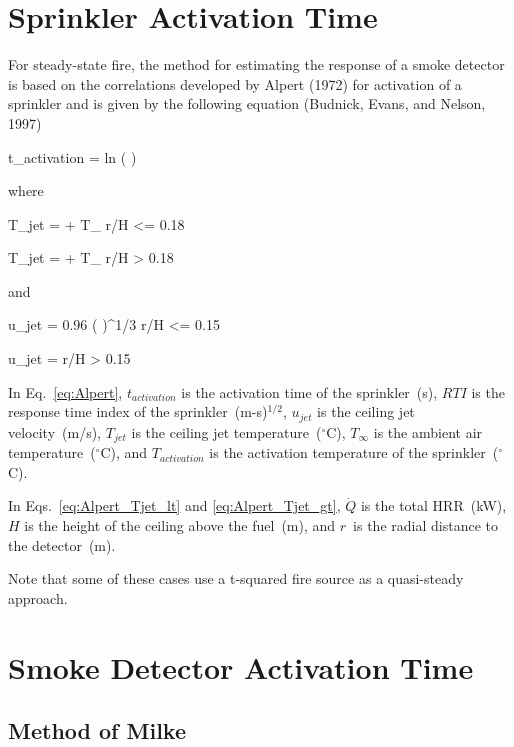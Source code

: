 \clearpage


\section{Sprinkler Activation Time}

For steady-state fire, the method for estimating the response of a smoke detector is based on the correlations developed by Alpert (1972) for activation of a sprinkler and is given by the following equation (Budnick, Evans, and Nelson, 1997)

\be
t_{activation} =   ln \left(  \right)\label{eq:Alpert}
\ee

\noindent where

\be
T_{jet} =  + T_\infty {} r/H <= 0.18
\label{eq:Alpert_Tjet_lt}
\ee

\be
T_{jet} =  + T_\infty {} r/H > 0.18
\label{eq:Alpert_Tjet_gt}
\ee

\noindent and

\be
u_{jet} = 0.96 \left(  \right)^{1/3}  r/H <= 0.15
\label{eq:Alpert_ujet_lt}
\ee

\be
u_{jet} =   r/H > 0.15
\label{eq:Alpert_ujet_gt}
\ee

In Eq.~\ref{eq:Alpert}, $t_{activation}$ is the activation time of the sprinkler~(s), $RTI$ is the response time index of the sprinkler~(m-s)$^{1/2}$, $u_{jet}$ is the ceiling jet velocity~(m/s), $T_{jet}$ is the ceiling jet temperature~($^\circ$C), $T_\infty$ is the ambient air temperature~($^\circ$C), and $T_{activation}$ is the activation temperature of the sprinkler~($^\circ$C).

In Eqs.~\ref{eq:Alpert_Tjet_lt} and \ref{eq:Alpert_Tjet_gt}, $\dot Q$ is the total HRR~(kW), $H$ is the height of the ceiling above the fuel~(m), and $r$~is the radial distance to the detector~(m).

Note that some of these cases use a t-squared fire source as a quasi-steady approach.


\clearpage


\section{Smoke Detector Activation Time}

\subsection{Method of Milke}

